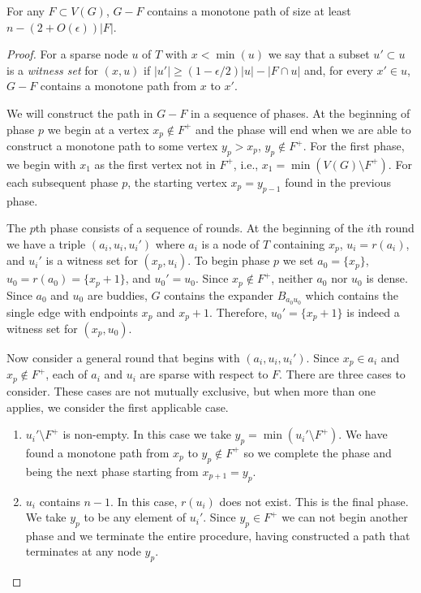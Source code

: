 \documentclass{patmorin}
\begin{document}
\begin{clm}
  For any $F\subset V(G)$, $G-F$ contains a monotone path 
  of size at least $n - (2+O(\epsilon))|F|$.
\end{clm}

\begin{proof}
  For a sparse node $u$ of $T$ with $x<\min(u)$ we say that a subset
  $u'\subset u$ is a \emph{witness set} for $(x,u)$ if $|u'|\ge
  (1-\epsilon/2)|u|-|F\cap u|$ and, for every $x'\in u$, $G-F$ contains
  a monotone path from $x$ to $x'$.

  We will construct the path in $G-F$ in a sequence of phases. At
  the beginning of phase $p$ we begin at a vertex $x_p\not\in F^+$
  and the phase will end when we are able to construct a monotone path to some
  vertex $y_p>x_p$, $y_p\not\in F^+$.  For the first phase, we begin with $x_1$
  as the first vertex not in $F^+$, i.e., $x_1=\min(V(G)\setminus F^+)$.
  For each subsequent phase $p$, the starting vertex $x_p=y_{p-1}$ found
  in the previous phase.

  The $p$th phase consists of a sequence of rounds. At the beginning of
  the $i$th round we have a triple $(a_i,u_i,u_i')$ where $a_i$ is a
  node of $T$ containing $x_p$, $u_i=r(a_i)$, and $u_i'$ is a witness
  set for $(x_p,u_i)$.  To begin phase $p$ we set $a_0=\{x_p\}$,
  $u_0=r(a_0)=\{x_p+1\}$, and $u_0'=u_0$.  Since $x_p\not\in F^+$,
  neither $a_0$ nor $u_0$ is dense.  Since $a_0$ and $u_0$ are buddies,
  $G$ contains the expander $B_{a_0u_0}$ which contains the single
  edge with endpoints $x_p$ and $x_p+1$.  Therefore, $u_0'=\{x_p+1\}$
  is indeed a witness set for $(x_p,u_0)$.

  Now consider a general round that begins with $(a_i,u_i,u_i')$.
  Since $x_p\in a_i$ and $x_p\not\in F^+$, each of $a_i$ and $u_i$ are
  sparse with respect to $F$. There are three cases to consider. These
  cases are not mutually exclusive, but when more than one applies,
  we consider the first applicable case.
  \begin{enumerate}
   \item $u_i'\setminus F^+$ is non-empty. In this case we take
    $y_p=\min(u_i'\setminus F^+)$. We have found a monotone
    path from $x_p$ to $y_p\not\in F^+$ so we complete the phase and
    being the next phase starting from $x_{p+1}=y_p$.

    \item $u_i$ contains $n-1$.  In this case, $r(u_i)$ does not exist.
    This is the final phase.  We take $y_p$ to be any element of $u_i'$.
    Since $y_p\in F^+$ we can not begin another phase and we terminate
    the entire procedure, having constructed a path that terminates at
    any node $y_p$.


\end{enumerate}
\end{proof}
\end{document}
